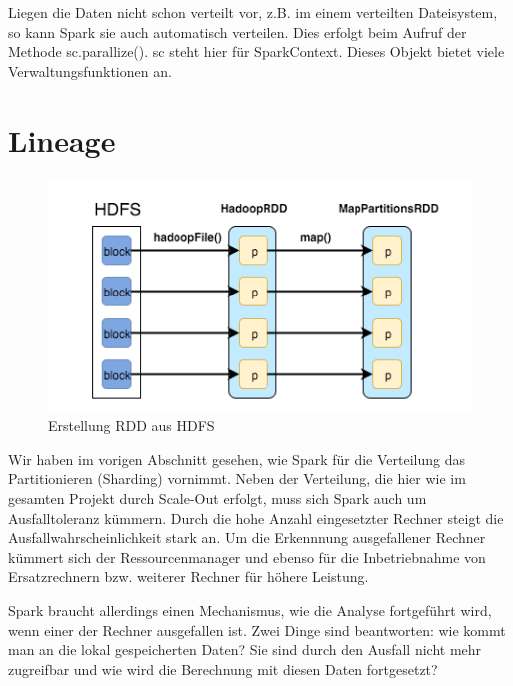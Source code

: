 Liegen die Daten nicht schon verteilt vor, z.B. im einem verteilten
Dateisystem, so kann Spark sie auch automatisch verteilen. Dies erfolgt
beim Aufruf der Methode sc.parallize(). sc steht hier für SparkContext.
Dieses Objekt bietet viele Verwaltungsfunktionen an. 

\section[Lineage]{\rmfamily Lineage}
\begin{figure}
\centering
\includegraphics[width=\textwidth]{bilder/Seminartext-img1.png}
\caption{Erstellung RDD aus HDFS} 
\end{figure}
Wir haben im vorigen Abschnitt gesehen, wie Spark für die Verteilung das
Partitionieren (Sharding) vornimmt. Neben der Verteilung, die hier wie
im gesamten Projekt durch Scale-Out erfolgt, muss sich Spark auch um
Ausfalltoleranz kümmern. Durch die hohe Anzahl eingesetzter Rechner
steigt die Ausfallwahrscheinlichkeit stark an. Um die Erkennnung
ausgefallener Rechner kümmert sich der Ressourcenmanager und ebenso für
die Inbetriebnahme von Ersatzrechnern bzw. weiterer Rechner für höhere
Leistung.

Spark braucht allerdings einen Mechanismus, wie die Analyse fortgeführt
wird, wenn einer der Rechner ausgefallen ist. Zwei Dinge sind
beantworten: wie kommt man an die lokal gespeicherten Daten? Sie sind durch
den Ausfall nicht mehr zugreifbar und wie wird die Berechnung mit
diesen Daten fortgesetzt?

